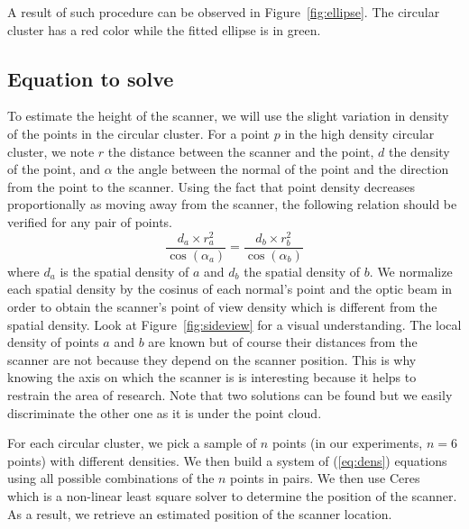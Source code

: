 A result of such procedure can be observed in Figure~\ref{fig:ellipse}. The circular cluster has a red color while the fitted ellipse is in green.


\subsection{Equation to solve}
\label{subsc:ellipse-eq}
To estimate the height of the scanner, we will use the slight variation in density of the points in the circular cluster.
For a point $p$ in the high density circular cluster, we note $r$ the distance between the scanner and the point, $d$ the density of the point, and $\alpha$ the angle between the normal of the point and the direction
from the point to the scanner. Using the fact that point density decreases proportionally as moving away from the scanner, the following relation should be verified for any pair of points.
\begin{equation}
\frac{d_a \times r_a^2}{\cos(\alpha_a)} = \frac{d_b \times r_b^2}{\cos(\alpha_b)}
\label{eq:dens}
\end{equation}
where $d_a$ is the spatial density of $a$ and $d_b$ the spatial density of $b$. We normalize each spatial density by the cosinus of each normal's point and the optic beam in order to obtain the scanner's point of view density which is different from the spatial density. Look at Figure~\ref{fig:sideview} for a visual understanding. The local density of points $a$ and $b$ are known but of course their distances from the scanner are not because they depend on the scanner position. This is why knowing the axis on which the scanner is is interesting because it helps to restrain the area of research. Note that two solutions can be found but we easily discriminate the other one as it is under the point cloud.

For each circular cluster, we pick a sample of $n$ points (in our experiments, $n=6$ points) with different densities. We then build a system of (\ref{eq:dens}) equations using all possible combinations of the $n$ points in pairs. We then use Ceres~\cite{ceres} which is a non-linear least square solver to determine the position of the scanner. As a result, we retrieve an estimated position of the scanner location.

